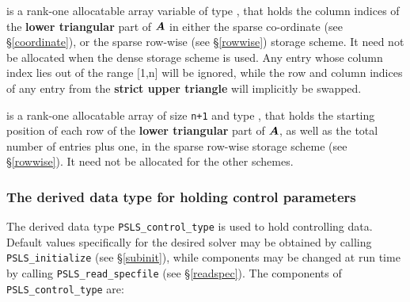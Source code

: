 \documentclass{galahad}
\newcommand{\packagename}{PSLS}
\begin{document}
\begin{description}
 is a rank-one allocatable array variable of type \integer,
that holds the column indices of the {\bf lower triangular} part of
${\bm{A}}$ in either the sparse co-ordinate
(see \S\ref{coordinate}), or the sparse row-wise
(see \S\ref{rowwise}) storage scheme.
It need not be allocated when the dense
storage scheme is used.
Any entry whose column index lies out of the range $[$1,n$]$ will be ignored,
while the row and column indices of any entry from the
{\bf strict upper triangle} will implicitly be swapped.

 is a rank-one allocatable array of size {\tt n+1} and type
\integer, that holds the starting position of
each row of the {\bf lower triangular} part of ${\bm{A}}$, as well
as the total number of entries plus one, in the sparse row-wise storage
scheme (see \S\ref{rowwise}). It need not be allocated for the
other schemes.

\end{description}


\subsubsection{The derived data type for holding control
 parameters}\label{typecontrol}
The derived data type
{\tt \packagename\_control\_type}
is used to hold controlling data.
Default values specifically for the desired solver
may be obtained by calling
{\tt \packagename\_initialize}
(see \S\ref{subinit}),
while components may be changed at run time by calling
{\tt \packagename\_read\-\_specfile}
(see \S\ref{readspec}).
The components of
{\tt \packagename\_control\_type}
are:
\end{document}
